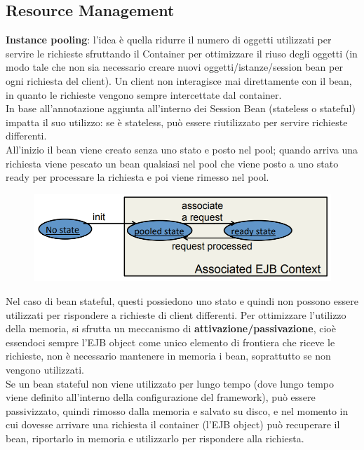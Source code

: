 \subsection{Resource Management}
\textbf{Instance pooling}: l’idea è quella ridurre il numero di oggetti utilizzati per servire le richieste sfruttando il Container per ottimizzare il riuso degli oggetti (in modo tale che non sia necessario creare nuovi oggetti/istanze/session bean per ogni richiesta del client). Un client non interagisce mai direttamente con il bean, in quanto le richieste vengono sempre intercettate dal container.\\

In base all’annotazione aggiunta all’interno dei Session Bean (stateless o stateful) impatta il suo utilizzo: se è stateless, può essere riutilizzato per servire richieste differenti.\\

All’inizio il bean viene creato senza uno stato e posto nel pool; quando arriva una richiesta viene pescato un bean qualsiasi nel pool che viene posto a uno stato ready per processare la richiesta e poi viene rimesso nel pool.
\begin{figure}[H]
    \centering
    \includegraphics[scale=0.3]{Imm/res-mange_1.png}
\end{figure}


Nel caso di bean stateful, questi possiedono uno stato e quindi non possono essere utilizzati per rispondere a richieste di client differenti. Per ottimizzare l’utilizzo della memoria, si sfrutta un meccanismo di \textbf{attivazione/passivazione}, cioè essendoci sempre l’EJB object come unico elemento di frontiera che riceve le richieste, non è necessario mantenere in memoria i bean, soprattutto se non vengono utilizzati.\\

Se un bean stateful non viene utilizzato per lungo tempo (dove lungo tempo viene definito all’interno della configurazione del framework), può essere passivizzato, quindi rimosso dalla memoria e salvato su disco, e nel momento in cui dovesse arrivare una richiesta il container (l’EJB object) può recuperare il bean, riportarlo in memoria e utilizzarlo per rispondere alla richiesta.
